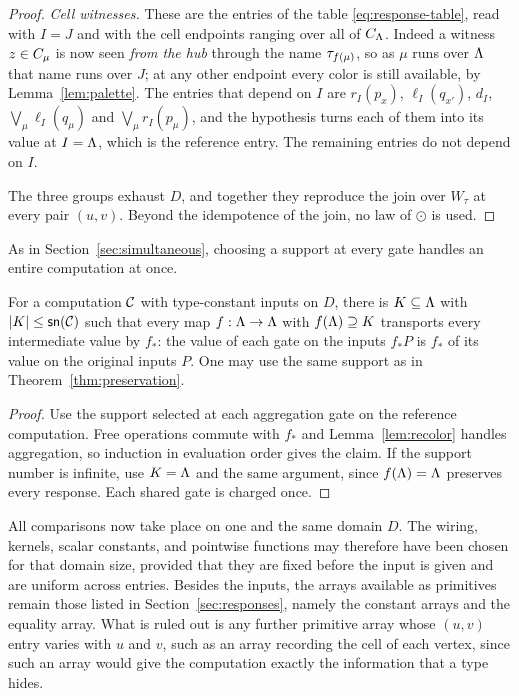 \begin{proof}
\emph{Cell witnesses.} These are the entries of the table
\eqref{eq:response-table}, read with $I=J$ and with the cell endpoints
ranging over all of $C_{\Lambda}$. Indeed a witness $z\in C_{\mu}$ is now seen
\emph{from the hub} through the name $\tau_{f(\mu)}$, so as $\mu$ runs over
$\Lambda$ that name runs over $J$; at any other endpoint every color is still
available, by Lemma~\ref{lem:palette}. The entries that depend on $I$ are
$r_I(p_x)$, $\ell_I(q_{x'})$, $d_I$, $\bigvee_\mu\ell_I(q_\mu)$ and
$\bigvee_\mu r_I(p_\mu)$, and the hypothesis turns each of them into its
value at $I=\Lambda$, which is the reference entry. The remaining entries do
not depend on $I$.

The three groups exhaust $D$, and together they reproduce the join over
$W_\tau$ at every pair $(u,v)$. Beyond the idempotence of the join, no law
of $\odot$ is used.
\end{proof}

As in Section~\ref{sec:simultaneous}, choosing a support at every gate
handles an entire computation at once.
\begin{theorem}\label{thm:transport}
For a computation $\mathcal C$ with type-constant inputs on $D$, there is
$K\subseteq\Lambda$ with $|K|\le\mathsf{sn}(\mathcal C)$ such that every map
$f:\Lambda\to\Lambda$ with $f(\Lambda)\supseteq K$ transports every intermediate
value by $f_\ast$: the value of each gate on the inputs $f_\ast P$ is
$f_\ast$ of its value on the original inputs $P$. One may use the same
support as in Theorem~\ref{thm:preservation}.
\end{theorem}
\begin{proof}
Use the support selected at each aggregation gate on the reference
computation. Free
operations commute with $f_\ast$ and Lemma~\ref{lem:recolor} handles
aggregation, so induction in evaluation order gives the claim. If the
support number is infinite, use $K=\Lambda$ and the same argument, since
$f(\Lambda)=\Lambda$ preserves every response. Each shared gate is charged once.
\end{proof}
All comparisons now take place on one and the same domain $D$. The wiring,
kernels, scalar constants, and pointwise functions may therefore have been
chosen for that domain size, provided that they are fixed before the input
is given and are uniform across entries. Besides the inputs, the arrays
available as primitives remain those listed in
Section~\ref{sec:responses}, namely the constant arrays and the equality
array. What is ruled out is any further primitive array whose $(u,v)$ entry
varies with $u$ and $v$, such as an array recording the cell of each
vertex, since such an array would give the computation exactly the
information that a type hides.

